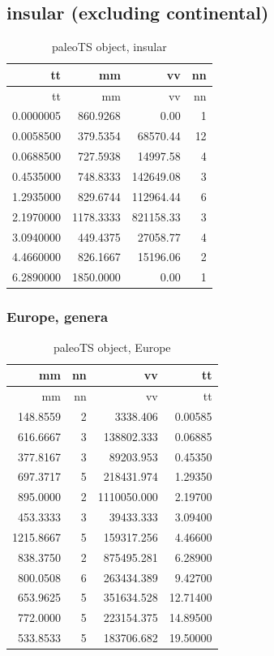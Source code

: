 \FloatBarrier

\subsection{insular (excluding
	continental)}\label{insular-excluding-continentalAP}


\begin{longtable}[]{@{}rrrr@{}}
	\caption{paleoTS object, insular}
	\label{tab:pTSI}\tabularnewline
	\toprule
	tt & mm & vv & nn\tabularnewline
	\midrule
	\endfirsthead
	\toprule
	tt & mm & vv & nn\tabularnewline
	\midrule
	\endhead
	0.0000005 & 860.9268 & 0.00 & 1\tabularnewline
	0.0058500 & 379.5354 & 68570.44 & 12\tabularnewline
	0.0688500 & 727.5938 & 14997.58 & 4\tabularnewline
	0.4535000 & 748.8333 & 142649.08 & 3\tabularnewline
	1.2935000 & 829.6744 & 112964.44 & 6\tabularnewline
	2.1970000 & 1178.3333 & 821158.33 & 3\tabularnewline
	3.0940000 & 449.4375 & 27058.77 & 4\tabularnewline
	4.4660000 & 826.1667 & 15196.06 & 2\tabularnewline
	6.2890000 & 1850.0000 & 0.00 & 1\tabularnewline
	\bottomrule
\end{longtable}


\FloatBarrier

\subsubsection{Europe, genera}\label{europe-genera}


\begin{longtable}[]{@{}rrrr@{}}
	\caption{paleoTS object, Europe}
	\label{tab:pTSEu}\tabularnewline
	\toprule
	mm & nn & vv & tt\tabularnewline
	\midrule
	\endfirsthead
	\toprule
	mm & nn & vv & tt\tabularnewline
	\midrule
	\endhead
	148.8559 & 2 & 3338.406 & 0.00585\tabularnewline
	616.6667 & 3 & 138802.333 & 0.06885\tabularnewline
	377.8167 & 3 & 89203.953 & 0.45350\tabularnewline
	697.3717 & 5 & 218431.974 & 1.29350\tabularnewline
	895.0000 & 2 & 1110050.000 & 2.19700\tabularnewline
	453.3333 & 3 & 39433.333 & 3.09400\tabularnewline
	1215.8667 & 5 & 159317.256 & 4.46600\tabularnewline
	838.3750 & 2 & 875495.281 & 6.28900\tabularnewline
	800.0508 & 6 & 263434.389 & 9.42700\tabularnewline
	653.9625 & 5 & 351634.528 & 12.71400\tabularnewline
	772.0000 & 5 & 223154.375 & 14.89500\tabularnewline
	533.8533 & 5 & 183706.682 & 19.50000\tabularnewline
	\bottomrule
\end{longtable}


\FloatBarrier





